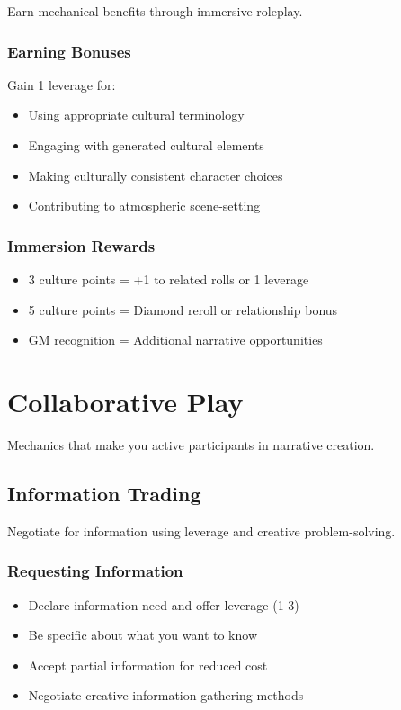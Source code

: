 Earn mechanical benefits through immersive roleplay.

\subsubsection{Earning Bonuses}

Gain 1 leverage for:
\begin{itemize}
\item Using appropriate cultural terminology
\item Engaging with generated cultural elements
\item Making culturally consistent character choices
\item Contributing to atmospheric scene-setting
\end{itemize}

\subsubsection{Immersion Rewards}

\begin{itemize}
\item 3 culture points = +1 to related rolls or 1 leverage
\item 5 culture points = Diamond reroll or relationship bonus
\item GM recognition = Additional narrative opportunities
\end{itemize}

\section{Collaborative Play}

Mechanics that make you active participants in narrative creation.

\subsection{Information Trading}

Negotiate for information using leverage and creative problem-solving.

\subsubsection{Requesting Information}

\begin{itemize}
\item Declare information need and offer leverage (1-3)
\item Be specific about what you want to know
\item Accept partial information for reduced cost
\item Negotiate creative information-gathering methods
\end{itemize}

